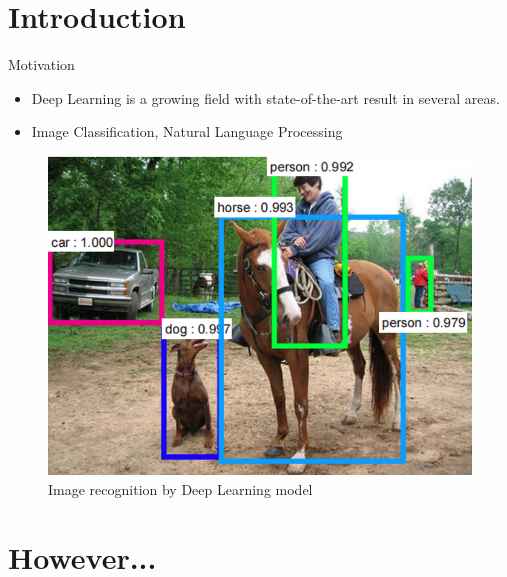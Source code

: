 \documentclass[10pt]{beamer}
\begin{document}
\maketitle

\section{Introduction}

\begin{frame}[fragile]{Motivation}
\begin{itemize}
\item \alert{Deep Learning} is a growing field with state-of-the-art result in
    several areas.
\vspace{0.5cm}
\item Image Classification, Natural Language Processing
\end{itemize}
\end{frame}

\begin{frame}[fragile]
    \begin{figure}[htp]
        \centering
        \includegraphics[scale=0.4]{images/image_classification.png}
        \caption{Image recognition by Deep Learning model \cite{faster_r_cnn}}
    \end{figure}
\end{frame}

\section{However...}
\end{document}
